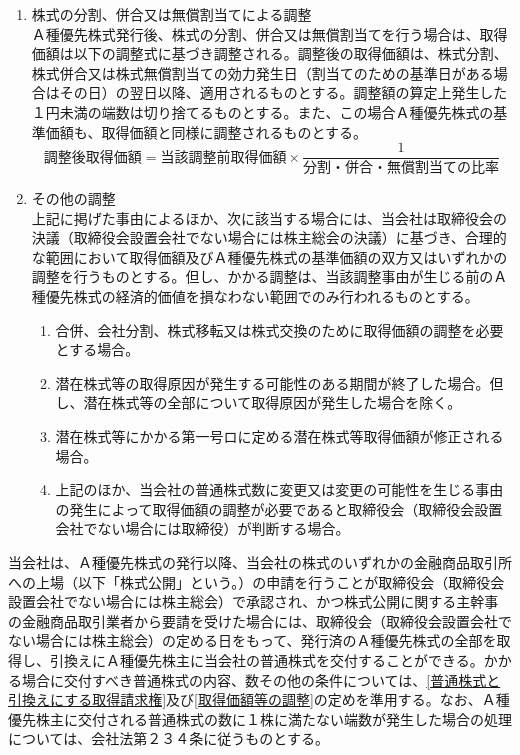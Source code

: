 \documentclass[10pt,a4paper,uplatex]{jsarticle}
\begin{document}
\begin{enumerate}
    \item 株式の分割、併合又は無償割当てによる調整\\
    Ａ種優先株式発行後、株式の分割、併合又は無償割当てを行う場合は、取得価額は以下の調整式に基づき調整される。調整後の取得価額は、株式分割、株式併合又は株式無償割当ての効力発生日（割当てのための基準日がある場合はその日）の翌日以降、適用されるものとする。調整額の算定上発生した１円未満の端数は切り捨てるものとする。また、この場合Ａ種優先株式の基準価額も、取得価額と同様に調整されるものとする。
      \begin{displaymath}
      調整後取得価額 = 当該調整前取得価額 \times \frac{1}{分割・併合・無償割当ての比率}
      \end{displaymath}
    \item その他の調整\\
    上記に掲げた事由によるほか、次に該当する場合には、当会社は取締役会の決議（取締役会設置会社でない場合には株主総会の決議）に基づき、合理的な範囲において取得価額及びＡ種優先株式の基準価額の双方又はいずれかの調整を行うものとする。但し、かかる調整は、当該調整事由が生じる前のＡ種優先株式の経済的価値を損なわない範囲でのみ行われるものとする。
      \begin{enumerate}
        \item 合併、会社分割、株式移転又は株式交換のために取得価額の調整を必要とする場合。
        \item 潜在株式等の取得原因が発生する可能性のある期間が終了した場合。但し、潜在株式等の全部について取得原因が発生した場合を除く。
        \item 潜在株式等にかかる第一号ロに定める潜在株式等取得価額が修正される場合。
        \item 上記のほか、当会社の普通株式数に変更又は変更の可能性を生じる事由の発生によって取得価額の調整が必要であると取締役会（取締役会設置会社でない場合には取締役）が判断する場合。
      \end{enumerate}
\end{enumerate}
当会社は、Ａ種優先株式の発行以降、当会社の株式のいずれかの金融商品取引所への上場（以下「株式公開」という。）の申請を行うことが取締役会（取締役会設置会社でない場合には株主総会）で承認され、かつ株式公開に関する主幹事の金融商品取引業者から要請を受けた場合には、取締役会（取締役会設置会社でない場合には株主総会）の定める日をもって、発行済のＡ種優先株式の全部を取得し、引換えにＡ種優先株主に当会社の普通株式を交付することができる。かかる場合に交付すべき普通株式の内容、数その他の条件については、\ref{普通株式と引換えにする取得請求権}及び\ref{取得価額等の調整}の定めを準用する。なお、Ａ種優先株主に交付される普通株式の数に１株に満たない端数が発生した場合の処理については、会社法第２３４条に従うものとする。
\end{document}
